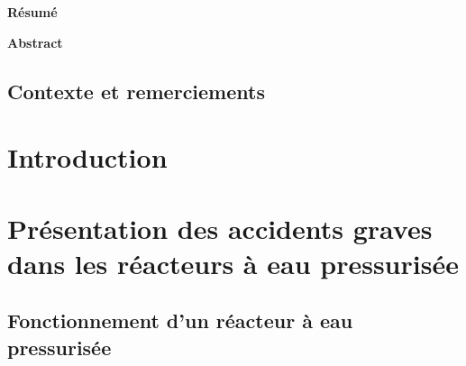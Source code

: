 \documentclass[a4paper,11pt]{report}    %
\begin{document}



\thispagestyle{empty}
\begin{center}
    \Large


    \vspace{0.9cm}
    \textbf{Résumé}
\end{center}

\blindtext

\begin{center}
	\Large
	\vspace{0.9cm}
	\textbf{Abstract}
\end{center}

\blindtext



\newpage
\hypersetup{pageanchor=true}
\setcounter{page}{1}
\tableofcontents



\newpage
\printnomenclature



\newpage
\section*{Contexte et remerciements}
\chapter{Introduction}
\chapter{Présentation des accidents graves dans les réacteurs à eau pressurisée}
\section{Fonctionnement d'un réacteur à eau pressurisée}
\end{document}
